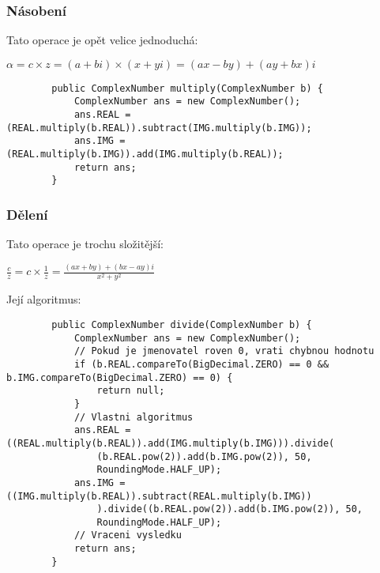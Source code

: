 \documentclass{article}
\begin{document}
    \subsubsection{Násobení}
    Tato operace je opět velice jednoduchá:
    \begin{center}
        $\alpha = c\times{z} = (a+bi)\times{(x+yi)} = (ax-by)+(ay+bx)i$
    \end{center}
    \begin{lstlisting}
        public ComplexNumber multiply(ComplexNumber b) {
            ComplexNumber ans = new ComplexNumber();
            ans.REAL = (REAL.multiply(b.REAL)).subtract(IMG.multiply(b.IMG));
            ans.IMG = (REAL.multiply(b.IMG)).add(IMG.multiply(b.REAL));
            return ans;
        }
    \end{lstlisting}
    \subsubsection{Dělení}
    Tato operace je trochu složitější:
    \begin{center}
        $\frac{c}{z} = c\times{\frac{1}{z}} = \frac{(ax+by)+(bx-ay)i}{x^2+y^2}$
    \end{center}
    Její algoritmus:
    \begin{lstlisting}
        public ComplexNumber divide(ComplexNumber b) {
            ComplexNumber ans = new ComplexNumber();
            // Pokud je jmenovatel roven 0, vrati chybnou hodnotu
            if (b.REAL.compareTo(BigDecimal.ZERO) == 0 && b.IMG.compareTo(BigDecimal.ZERO) == 0) {
                return null;
            }
            // Vlastni algoritmus
            ans.REAL = ((REAL.multiply(b.REAL)).add(IMG.multiply(b.IMG))).divide(
                (b.REAL.pow(2)).add(b.IMG.pow(2)), 50, 
                RoundingMode.HALF_UP);
            ans.IMG = ((IMG.multiply(b.REAL)).subtract(REAL.multiply(b.IMG))
                ).divide((b.REAL.pow(2)).add(b.IMG.pow(2)), 50, 
                RoundingMode.HALF_UP);
            // Vraceni vysledku
            return ans;
        }
    \end{lstlisting}
\end{document}
